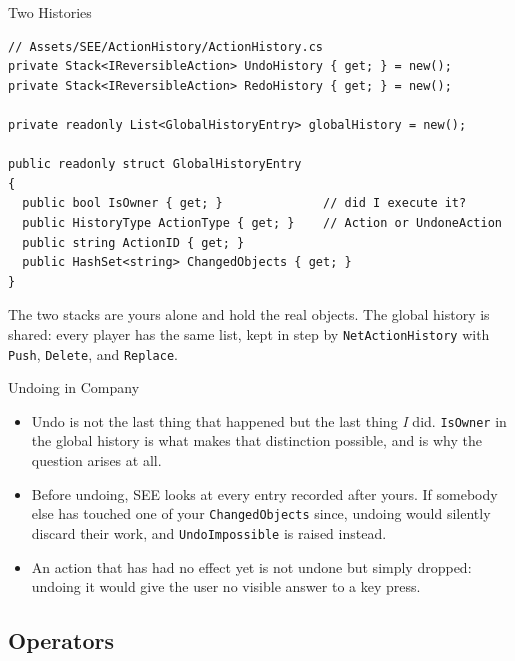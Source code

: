 \begin{frame}[fragile]{Two Histories}
  \begin{lstlisting}[basicstyle=\scriptsize\ttfamily]
// Assets/SEE/ActionHistory/ActionHistory.cs
private Stack<IReversibleAction> UndoHistory { get; } = new();
private Stack<IReversibleAction> RedoHistory { get; } = new();

private readonly List<GlobalHistoryEntry> globalHistory = new();

public readonly struct GlobalHistoryEntry
{
  public bool IsOwner { get; }              // did I execute it?
  public HistoryType ActionType { get; }    // Action or UndoneAction
  public string ActionID { get; }
  public HashSet<string> ChangedObjects { get; }
}
  \end{lstlisting}
  \vspace{1ex}

  The two stacks are yours alone and hold the real objects. The global history
  is shared: every player has the same list, kept in step by
  \texttt{NetActionHistory} with \texttt{Push}, \texttt{Delete}, and
  \texttt{Replace}.
\end{frame}

\begin{frame}{Undoing in Company}
  \begin{itemize}
    \item Undo is not the last thing that happened but the last thing
      \emph{I} did. \texttt{IsOwner} in the global history is what makes that
      distinction possible, and  is why the question
      arises at all.
    \item Before undoing, SEE looks at every entry recorded after yours. If
      somebody else has touched one of your \texttt{ChangedObjects} since,
      undoing would silently discard their work, and \texttt{UndoImpossible}
      is raised instead.
    \item An action that has had no effect yet is not undone but simply
      dropped: undoing it would give the user no visible answer to a key
      press.
  \end{itemize}
  \vspace{2ex}

\end{frame}

\subsection{Operators}

